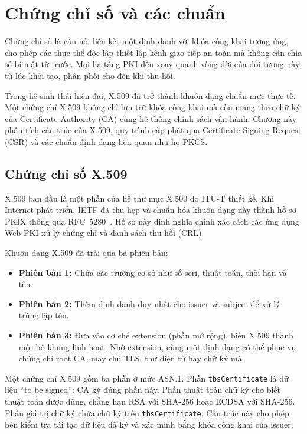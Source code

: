 \chapter{Chứng chỉ số và các chuẩn}
\label{chap:x509}

Chứng chỉ số là cầu nối liên kết một định danh với khóa công khai tương ứng, cho phép các thực thể độc lập thiết lập kênh giao tiếp an toàn mà không cần chia sẻ bí mật từ trước. Mọi hạ tầng PKI đều xoay quanh vòng đời của đối tượng này: từ lúc khởi tạo, phân phối cho đến khi thu hồi.

Trong hệ sinh thái hiện đại, X.509 đã trở thành khuôn dạng chuẩn mực thực tế. Một chứng chỉ X.509 không chỉ lưu trữ khóa công khai mà còn mang theo chữ ký của Certificate Authority (CA) cùng hệ thống chính sách vận hành. Chương này phân tích cấu trúc của X.509, quy trình cấp phát qua Certificate Signing Request (CSR) và các chuẩn định dạng liên quan như họ PKCS.

\section{Chứng chỉ số X.509}
\label{sec:4.1}

X.509 ban đầu là một phần của hệ thư mục X.500 do ITU-T thiết kế. Khi Internet phát triển, IETF đã thu hẹp và chuẩn hóa khuôn dạng này thành hồ sơ PKIX thông qua RFC~5280~\cite{RFC5280}. Hồ sơ này định nghĩa chính xác cách các ứng dụng Web PKI xử lý chứng chỉ và danh sách thu hồi (CRL).

Khuôn dạng X.509 đã trải qua ba phiên bản:
\begin{itemize}
    \item \textbf{Phiên bản 1:} Chứa các trường cơ sở như số seri, thuật toán, thời hạn và tên.
    \item \textbf{Phiên bản 2:} Thêm định danh duy nhất cho issuer và subject để xử lý trùng lặp tên.
    \item \textbf{Phiên bản 3:} Đưa vào cơ chế extension (phần mở rộng), biến X.509 thành một bộ khung linh hoạt. Nhờ extension, cùng một định dạng có thể phục vụ chứng chỉ root CA, máy chủ TLS, thư điện tử hay chữ ký mã.
\end{itemize}

Một chứng chỉ X.509 gồm ba phần ở mức ASN.1. Phần
\texttt{tbsCertificate} là dữ liệu \enquote{to be signed}:
CA ký đúng phần này. Phần thuật toán chữ ký cho biết thuật toán
được dùng, chẳng hạn RSA với SHA-256 hoặc ECDSA với SHA-256.
Phần giá trị chữ ký chứa chữ ký trên \texttt{tbsCertificate}.
Cấu trúc này cho phép bên kiểm tra tái tạo dữ liệu đã ký và xác
minh bằng khóa công khai của issuer.

